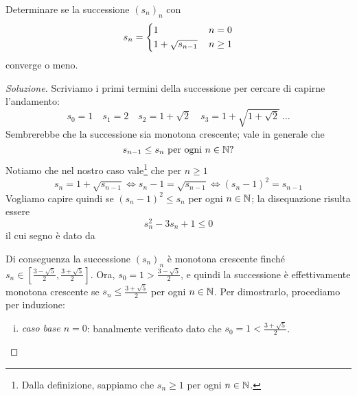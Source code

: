\begin{exercise}
    \label{ex:4.8}
    Determinare se la successione $(s_n)_n$ con
    \[
    s_n = \begin{dcases}
        1\, & n=0\\
        1+\sqrt{s_{n-1}}\, & n\ge 1
    \end{dcases}
    \]
    converge o meno.
\end{exercise}
\begin{proof}[Soluzione]
    Scriviamo i primi termini della successione per cercare di capirne l'andamento:
    \[
    s_0 = 1 \quad s_1 = 2 \quad s_2 = 1+\sqrt{2} \quad s_3 = 1+ \sqrt{1+\sqrt{2}} \ \dots
    \]
    Sembrerebbe che la successione sia monotona crescente; vale in generale che
    \[
    s_{n-1}\le s_n \ \text{per ogni} \ n\in\amsbb{N} \text{?}
    \]
    Notiamo che nel nostro caso vale\footnote{Dalla definizione, sappiamo che $s_n\ge 1$ per ogni $n\in\amsbb{N}$.} che per $n\ge 1$
    \[
    s_n = 1 +\sqrt{s_{n-1}} \iff s_n-1 = \sqrt{s_{n-1}} \iff (s_n-1)^2 = s_{n-1}
    \]
    Vogliamo capire quindi se $(s_n-1)^2 \le s_n$ per ogni $n\in\amsbb{N}$; la disequazione risulta essere
    \[
    s_n^2 -3s_n +1 \le 0
    \]
    il cui segno è dato da
    \begin{center}
        \end{center}
        Di conseguenza la successione $(s_n)_n$ è monotona crescente finché $s_n\in\left[\frac{3-\sqrt{5}}{2}, \frac{3+\sqrt{5}}{2}\right]$. Ora, $s_0 = 1 > \frac{3-\sqrt{5}}{2}$, e quindi la successione è effettivamente monotona crescente se $s_n\le \frac{3+\sqrt{5}}{2}$ per ogni $n\in\amsbb{N}$. Per dimostrarlo, procediamo per induzione:
        \begin{enumerate}[(i)]
            \item \emph{caso base $n=0$}: banalmente verificato dato che $s_0 = 1 < \frac{3+\sqrt{5}}{2}$.

\end{enumerate}
\end{proof}
